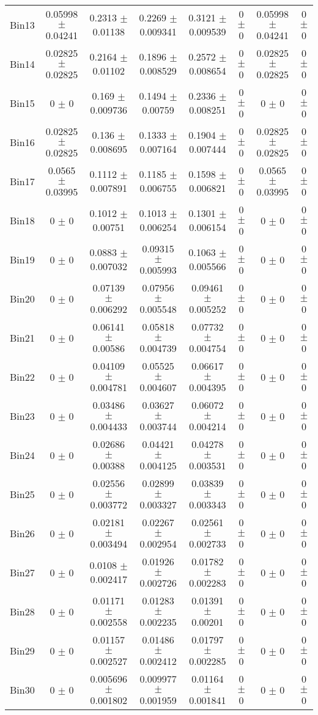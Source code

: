 \begin{tabular}{@{\extracolsep{4pt}}lccccccc@{}}
     Bin13 & 0.05998 $\pm$ 0.04241 & 0.2313 $\pm$ 0.01138 & 0.2269 $\pm$ 0.009341 & 0.3121 $\pm$ 0.009539 & 0 $\pm$ 0 & 0.05998 $\pm$ 0.04241 & 0 $\pm$ 0 \\ 
     Bin14 & 0.02825 $\pm$ 0.02825 & 0.2164 $\pm$ 0.01102 & 0.1896 $\pm$ 0.008529 & 0.2572 $\pm$ 0.008654 & 0 $\pm$ 0 & 0.02825 $\pm$ 0.02825 & 0 $\pm$ 0 \\ 
     Bin15 & 0 $\pm$ 0 & 0.169 $\pm$ 0.009736 & 0.1494 $\pm$ 0.00759 & 0.2336 $\pm$ 0.008251 & 0 $\pm$ 0 & 0 $\pm$ 0 & 0 $\pm$ 0 \\ 
     Bin16 & 0.02825 $\pm$ 0.02825 & 0.136 $\pm$ 0.008695 & 0.1333 $\pm$ 0.007164 & 0.1904 $\pm$ 0.007444 & 0 $\pm$ 0 & 0.02825 $\pm$ 0.02825 & 0 $\pm$ 0 \\ 
     Bin17 & 0.0565 $\pm$ 0.03995 & 0.1112 $\pm$ 0.007891 & 0.1185 $\pm$ 0.006755 & 0.1598 $\pm$ 0.006821 & 0 $\pm$ 0 & 0.0565 $\pm$ 0.03995 & 0 $\pm$ 0 \\ 
     Bin18 & 0 $\pm$ 0 & 0.1012 $\pm$ 0.00751 & 0.1013 $\pm$ 0.006254 & 0.1301 $\pm$ 0.006154 & 0 $\pm$ 0 & 0 $\pm$ 0 & 0 $\pm$ 0 \\ 
     Bin19 & 0 $\pm$ 0 & 0.0883 $\pm$ 0.007032 & 0.09315 $\pm$ 0.005993 & 0.1063 $\pm$ 0.005566 & 0 $\pm$ 0 & 0 $\pm$ 0 & 0 $\pm$ 0 \\ 
     Bin20 & 0 $\pm$ 0 & 0.07139 $\pm$ 0.006292 & 0.07956 $\pm$ 0.005548 & 0.09461 $\pm$ 0.005252 & 0 $\pm$ 0 & 0 $\pm$ 0 & 0 $\pm$ 0 \\ 
     Bin21 & 0 $\pm$ 0 & 0.06141 $\pm$ 0.00586 & 0.05818 $\pm$ 0.004739 & 0.07732 $\pm$ 0.004754 & 0 $\pm$ 0 & 0 $\pm$ 0 & 0 $\pm$ 0 \\ 
     Bin22 & 0 $\pm$ 0 & 0.04109 $\pm$ 0.004781 & 0.05525 $\pm$ 0.004607 & 0.06617 $\pm$ 0.004395 & 0 $\pm$ 0 & 0 $\pm$ 0 & 0 $\pm$ 0 \\ 
     Bin23 & 0 $\pm$ 0 & 0.03486 $\pm$ 0.004433 & 0.03627 $\pm$ 0.003744 & 0.06072 $\pm$ 0.004214 & 0 $\pm$ 0 & 0 $\pm$ 0 & 0 $\pm$ 0 \\ 
     Bin24 & 0 $\pm$ 0 & 0.02686 $\pm$ 0.00388 & 0.04421 $\pm$ 0.004125 & 0.04278 $\pm$ 0.003531 & 0 $\pm$ 0 & 0 $\pm$ 0 & 0 $\pm$ 0 \\ 
     Bin25 & 0 $\pm$ 0 & 0.02556 $\pm$ 0.003772 & 0.02899 $\pm$ 0.003327 & 0.03839 $\pm$ 0.003343 & 0 $\pm$ 0 & 0 $\pm$ 0 & 0 $\pm$ 0 \\ 
     Bin26 & 0 $\pm$ 0 & 0.02181 $\pm$ 0.003494 & 0.02267 $\pm$ 0.002954 & 0.02561 $\pm$ 0.002733 & 0 $\pm$ 0 & 0 $\pm$ 0 & 0 $\pm$ 0 \\ 
     Bin27 & 0 $\pm$ 0 & 0.0108 $\pm$ 0.002417 & 0.01926 $\pm$ 0.002726 & 0.01782 $\pm$ 0.002283 & 0 $\pm$ 0 & 0 $\pm$ 0 & 0 $\pm$ 0 \\ 
     Bin28 & 0 $\pm$ 0 & 0.01171 $\pm$ 0.002558 & 0.01283 $\pm$ 0.002235 & 0.01391 $\pm$ 0.00201 & 0 $\pm$ 0 & 0 $\pm$ 0 & 0 $\pm$ 0 \\ 
     Bin29 & 0 $\pm$ 0 & 0.01157 $\pm$ 0.002527 & 0.01486 $\pm$ 0.002412 & 0.01797 $\pm$ 0.002285 & 0 $\pm$ 0 & 0 $\pm$ 0 & 0 $\pm$ 0 \\ 
     Bin30 & 0 $\pm$ 0 & 0.005696 $\pm$ 0.001802 & 0.009977 $\pm$ 0.001959 & 0.01164 $\pm$ 0.001841 & 0 $\pm$ 0 & 0 $\pm$ 0 & 0 $\pm$ 0 \\ 
\hline\hline
  \end{tabular}
